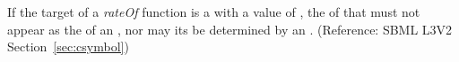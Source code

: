 If the target of a \emph{rateOf}  function is a \Species with a  value of , the  of that \Species must not appear as the  of an \AssignmentRule, nor may its  be determined by an \AlgebraicRule.  (Reference: SBML L3V2 Section~\ref{sec:csymbol})

